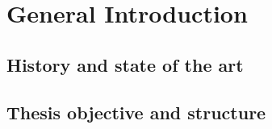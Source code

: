 	
			
	

	
\chapter{General Introduction}
\label{chap:intro}
\newpage

\section{History and state of the art}
\label{sec:intro:hist_soa}
\newpage



\section{Thesis objective and structure}
\label{sec:intro:obj_and_struct}








